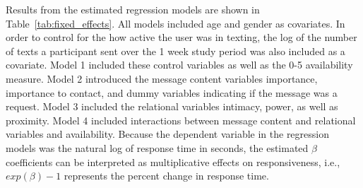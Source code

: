 \documentclass[12pt]{nuthesis}	%
\begin{document}
Results from the estimated regression models are shown in Table~\ref{tab:fixed_effects}. All models included age and gender as covariates. In order to control for the how active the user was in texting, the log of the number of texts a participant sent over the 1 week study period was also included as a covariate. Model 1 included these control variables as well as the 0-5 availability measure. Model 2 introduced the message content variables importance, importance to contact, and dummy variables indicating if the message was a request. Model 3 included the relational variables intimacy, power, as well as proximity. Model 4 included interactions between message content and relational variables and availability. Because the dependent variable in the regression models was the natural log of response time in seconds, the estimated $\beta$ coefficients can be interpreted as multiplicative effects on responsiveness, i.e., $exp(\beta) - 1 $ represents the percent change in response time.
\end{document}
